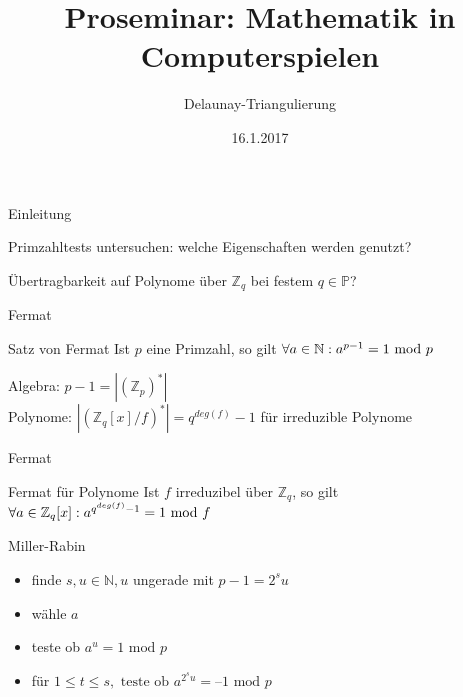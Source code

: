 \documentclass[german,10pt,xcolor=colortbl,compress]{beamer}%
\title{Proseminar: Mathematik in Computerspielen}
\subtitle{Delaunay-Triangulierung}
\date[]{16.1.2017} %
\newcommand{\ZZ}{\mathbb{Z}}
\newcommand{\NN}{\mathbb{N}}
\newcommand{\PP}{\mathbb{P}}
\begin{document}
	\maketitle
	
	
	\begin{frame}{Einleitung}
		
	Primzahltests untersuchen: welche Eigenschaften werden genutzt? \\
	\medskip 
	
	Übertragbarkeit auf Polynome über $\ZZ_q$ bei festem $q \in \PP$?
		
		
		
	\end{frame}
	
	
	\begin{frame}{Fermat}
		
		\begin{block}{Satz von Fermat}
			Ist $p$ eine Primzahl, so gilt $  \forall a \in \NN :  
		\newline	a^{p-1} = 1 \text{ mod } p $
			
			
		\end{block}
		\medskip
		Algebra: $p-1 = |(\ZZ_p)^*|$ \\
		\medskip
		Polynome: $ |(\ZZ_q[x]/f)^*| =q^{deg(f)}-1 $ für irreduzible Polynome
		
		
	
	\end{frame}
	
	\begin{frame}{Fermat}
		\begin{block}{Fermat für Polynome}
			Ist $f$ irreduzibel über $\ZZ_q$, so gilt $  \forall a \in \ZZ_q[x] :
			 \newline a^{q^{deg(f)}-1} = 1 \text{ mod } f$
		\end{block}
	\end{frame}
	
	\begin{frame}{Miller-Rabin}
		
		\begin{itemize}
			\item finde $s,u \in \NN,u $ ungerade mit $p-1=2^su $
			\item wähle $a$ 
			\item teste ob $a^u = 1 \text{ mod } p$
			\item für $1\leq t\leq s, \text{ teste ob } a^{2^s u} = \text{--}1 \text{ mod } p$
			
		\end{itemize}
		
		
	\end{frame}
\end{document}
